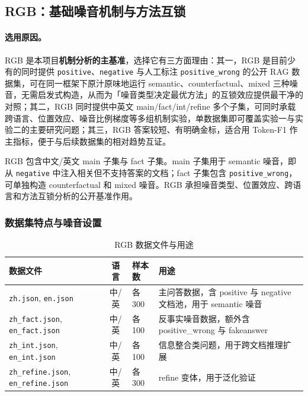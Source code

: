 \documentclass[UTF8,zihao=-4]{ctexart}
\begin{document}
\subsection{RGB：基础噪音机制与方法互锁}

\paragraph{选用原因。} RGB 是本项目\textbf{机制分析的主基准}，选择它有三方面理由：其一，RGB 是目前少有的同时提供 \texttt{positive}、\texttt{negative} 与人工标注 \texttt{positive\_wrong} 的公开 RAG 数据集，可在同一框架下原汁原味地运行 semantic、counterfactual、mixed 三种噪音，无需启发式构造，从而为「噪音类型决定最优方法」的互锁效应提供最干净的对照；其二，RGB 同时提供中英文 main/fact/int/refine 多个子集，可同时承载跨语言、位置效应、噪音比例梯度等多组机制实验，单数据集即可覆盖实验一与实验二的主要研究问题；其三，RGB 答案较短、有明确金标，适合用 Token-F1 作主指标，便于与后续数据集的相对趋势互证。

RGB 包含中文/英文 main 子集与 fact 子集。main 子集用于 semantic 噪音，即从 \texttt{negative} 中注入相关但不支持答案的文档；fact 子集包含 \texttt{positive\_wrong}，可单独构造 counterfactual 和 mixed 噪音。RGB 承担噪音类型、位置效应、跨语言和方法互锁分析的公开基准作用。

\subsubsection{数据集特点与噪音设置}

\begin{table}[H]
  \centering
  \caption{RGB 数据文件与用途}
  \begin{tabularx}{\textwidth}{lclY}
    \toprule
    数据文件 & 语言 & 样本数 & 用途 \\
    \midrule
    \texttt{zh.json}, \texttt{en.json} & 中/英 & 各 300 & 主问答数据，含 positive 与 negative 文档池，用于 semantic 噪音 \\
    \texttt{zh\_fact.json}, \texttt{en\_fact.json} & 中/英 & 各 100 & 反事实噪音数据，额外含 positive\_wrong 与 fakeanswer \\
    \texttt{zh\_int.json}, \texttt{en\_int.json} & 中/英 & 各 100 & 信息整合类问题，用于跨文档推理扩展 \\
    \texttt{zh\_refine.json}, \texttt{en\_refine.json} & 中/英 & 各 300 & refine 变体，用于泛化验证 \\
    \bottomrule
  \end{tabularx}
\end{table}
\end{document}
